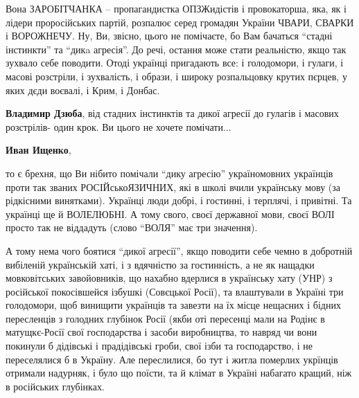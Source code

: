 \begin{itemize}
\begin{itemize}
Вона ЗАРОБІТЧАНКА – пропагандистка ОПЗЖидістів і провокаторша, яка, як і лідери
проросійських партій, розпалює серед громадян України ЧВАРИ, СВАРКИ і
ВОРОЖНЕЧУ. Ну, Ви, звісно, цього не помічаєте, бо Вам бачаться \enquote{стадні
інстинкти} та \enquote{дикa агресія}. До речі, остання може стати реальністю, якщо так
зухвало себе поводити. Отоді українці пригадають все: і голодомори, і гулаги, і
масові розстріли, і зухвалість, і образи, і широку розпальцовку крутих пєрцев,
у яких дєди воєвалі, і Крим, і Донбас.

 
\textbf{Владимир Дзюба}, від стадних інстинктів та дикої агресії до гулагів і масових розстрілів- один крок. Ви цього не хочете помічати...

 
\textbf{Иван Ищенко}, 

то є брехня, що Ви нібито помічали \enquote{дику агресію} україномовних українців проти
так званих РОСІЙськоЯЗИЧНИХ, які в школі вчили українську мову (за рідкісними
винятками). Українці люди добрі, і гостинні, і терплячі, і привітні. Та
українці ще й ВОЛЕЛЮБНІ. А тому свого, своєї державної мови, своєї ВОЛІ просто
так не віддадуть (слово \enquote{ВОЛЯ} має три значення). 

А тому нема чого боятися \enquote{дикої агресії}, якщо поводити себе чемно в добротній
вибіленій українській хаті, і з вдячністю за гостинність, а не як нащадки
мовковітських завойовників, що нахабно вдерлися в українську хату (УНР) з
російської покосівшейся ізбушкі (Совєцької Росії), та влаштували в Україні три
голодомори, щоб винищити українців та завезти на їх місце нещасних і бідних
пересленців з голодних глубінок Росії (якби оті пересенці мали на Родінє в
матущкє-Росії свої господарства і засоби виробництва, то навряд чи вони
покинули б дідівські і прадідівські гроби, свої ізби та господарство, і не
переселялися б в Україну. Але переслилися, бо тут і житла померлих укрїнців
отримали надурняк, і було що поїсти, та й клімат в Україні набагато кращий, ніж
в російських глубінках.

\end{itemize}

 


\end{itemize}
